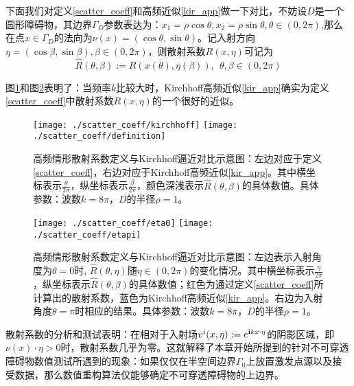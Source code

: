 下面我们对定义\ref{scatter_coeff}和高频近似\ref{kir_app}做一下对比，不妨设$D$是一个圆形障碍物，其边界$\Gamma_D$参数表达为：$x_1=\rho\cos\theta,x_2=\rho\sin\theta,\theta\in(0,2\pi)$,那么在点$x\in\Gamma_D$的法向为$\nu(x)=(\cos\theta,\sin\theta)$。记入射方向$\eta=(\cos\beta,\sin\beta),\beta\in(0,2\pi)$，则散射系数$R(x,\eta)$可记为
\begin{equation}
 \hat R(\theta,\beta):=R(x(\theta),\eta(\beta)),\  \ \theta,\beta\in(0,2\pi)
\end{equation}

图\ref{com_kir_def1}和图\ref{com_kir_def2}表明了：当频率$k$比较大时，Kirchhoff高频近似\ref{kir_app}确实为定义\ref{scatter_coeff}中散射系数$R(x,\eta)$的一个很好的近似。

\begin{figure}[htbp]
	\centering
	\texttt{[image: ./scatter\_coeff/kirchhoff]}
	\texttt{[image: ./scatter\_coeff/definition]}
	\caption{高频情形散射系数定义与Kirchhoff逼近对比示意图：左边对应于定义\ref{scatter_coeff}，右边对应于Kirchhoff高频近似\ref{kir_app}。其中横坐标表示$\frac{\theta}{2\pi}$，纵坐标表示$\frac{\beta}{2\pi}$，颜色深浅表示$\hat R(\theta,\beta)$的具体数值。具体参数：波数$k=8\pi$，$D$的半径$\rho=1$。}\label{com_kir_def1}
\end{figure}
\begin{figure}[htbp]
	\centering
	\texttt{[image: ./scatter\_coeff/eta0]}
	\texttt{[image: ./scatter\_coeff/etapi]}
	\caption{高频情形散射系数定义与Kirchhoff逼近对比示意图：左边表示入射角度为$\theta=0$时, $\hat R(\theta,\eta)$随$\eta\in(0,2\pi)$的变化情况。其中横坐标表示$\frac{\eta}{2\pi}$，纵坐标表示$\hat R(\theta,\beta)$的具体数值；红色为通过定义\ref{scatter_coeff}所计算出的散射系数，蓝色为Kirchhoff高频近似\ref{kir_app}。右边为入射角度$\theta=\pi$时相应的结果。具体参数：波数$k=8\pi$，$D$的半径$\rho=1$。}\label{com_kir_def2}
\end{figure}

散射系数的分析和测试表明：在相对于入射场$v^i(x,\eta):=e^{\mathbf{i} kx\cdot\eta}$的阴影区域，即$\nu(x)\cdot\eta>0$时，散射系数几乎为零。这就解释了本章开始所提到的针对不可穿透障碍物数值测试所遇到的现象：如果仅仅在半空间边界$\Gamma_0$上放置激发点源以及接受数据，那么数值重构算法仅能够确定不可穿透障碍物的上边界。